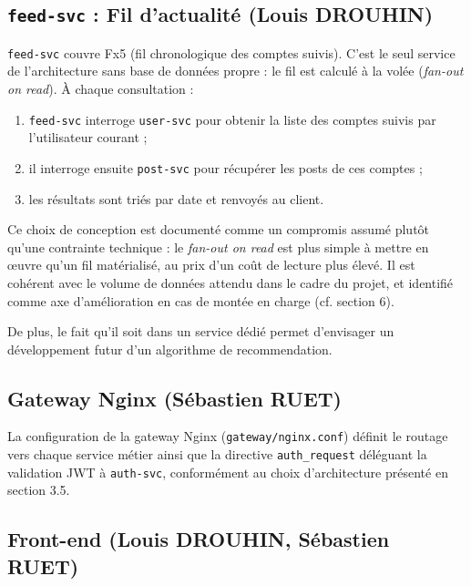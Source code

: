 \documentclass{cesi}
\begin{document}
\subsection{\texttt{feed-svc} : Fil d'actualité (Louis DROUHIN)}

\texttt{feed-svc} couvre Fx5 (fil chronologique des comptes suivis). C'est le seul
service de l'architecture sans base de données propre : le fil est calculé
à la volée (\emph{fan-out on read}). À chaque consultation :

\begin{enumerate}
  \item \texttt{feed-svc} interroge \texttt{user-svc} pour obtenir la liste des
        comptes suivis par l'utilisateur courant ;
  \item il interroge ensuite \texttt{post-svc} pour récupérer les posts de ces
        comptes ;
  \item les résultats sont triés par date et renvoyés au client.
\end{enumerate}

\begin{infobox}
Ce choix de conception est documenté comme un compromis assumé plutôt qu'une
contrainte technique : le \emph{fan-out on read} est plus simple à mettre en œuvre
qu'un fil matérialisé, au prix d'un coût de lecture plus élevé. Il est cohérent
avec le volume de données attendu dans le cadre du projet, et identifié comme axe
d'amélioration en cas de montée en charge (cf. section 6).

De plus, le fait qu'il soit
dans un service dédié permet d'envisager un développement futur d'un algorithme
de recommendation.
\end{infobox}

\subsection{Gateway Nginx (Sébastien RUET)}

La configuration de la gateway Nginx (\texttt{gateway/nginx.conf})
définit le routage vers chaque service métier ainsi que la directive
\texttt{auth\_request} déléguant la validation JWT à \texttt{auth-svc}, conformément
au choix d'architecture présenté en section 3.5.

\subsection{Front-end (Louis DROUHIN, Sébastien RUET)}
\end{document}
